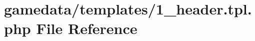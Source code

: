 \hypertarget{1__header_8tpl_8php}{\section{gamedata/templates/1\+\_\+header.tpl.\+php File Reference}
\label{1__header_8tpl_8php}
}

